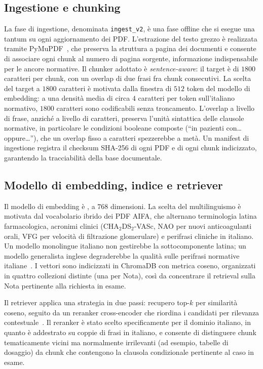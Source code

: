 \subsection{Ingestione e chunking}
\label{subsec:ingestione}

La fase di ingestione, denominata \texttt{ingest\_v2}, è una fase offline
che si esegue una tantum su ogni aggiornamento dei PDF.
L'estrazione del testo grezzo è realizzata tramite PyMuPDF~\cite{pymupdf},
che preserva la struttura a pagina dei documenti e consente di associare
ogni chunk al numero di pagina sorgente, informazione indispensabile per
le ancore normative.
Il chunker adottato è \emph{sentence-aware}: il target è di $1800$ caratteri
per chunk, con un overlap di due frasi fra chunk consecutivi.
La scelta del target a $1800$ caratteri è motivata dalla finestra di $512$
token del modello di embedding: a una densità media di circa $4$ caratteri
per token sull'italiano normativo, $1800$ caratteri sono codificabili senza
troncamento.
L'overlap a livello di frase, anziché a livello di caratteri, preserva
l'unità sintattica delle clausole normative, in particolare le condizioni
booleane composte (``in pazienti con\ldots oppure\ldots''), che un overlap
fisso a caratteri spezzerebbe a metà.
Un manifest di ingestione registra il checksum SHA-256 di ogni PDF e di
ogni chunk indicizzato, garantendo la tracciabilità della base documentale.

\subsection{Modello di embedding, indice e retriever}
\label{subsec:embedding-retriever}

Il modello di embedding è \embedmodel, a $768$ dimensioni.
La scelta del multilinguismo è motivata dal vocabolario ibrido dei PDF AIFA,
che alternano terminologia latina farmacologica, acronimi clinici
(CHA$_2$DS$_2$-VASc, NAO per nuovi anticoagulanti orali, VFG per velocità di filtrazione glomerulare) e perifrasi cliniche in italiano.
Un modello monolingue italiano non gestirebbe la sottocomponente latina;
un modello generalista inglese degraderebbe la qualità sulle perifrasi
normative italiane~\cite{reimers2019sbert}.
I vettori sono indicizzati in ChromaDB con metrica coseno, organizzati
in quattro collezioni distinte (una per Nota), così da concentrare il
retrieval sulla Nota pertinente alla richiesta in esame.

Il retriever applica una strategia in due passi: recupero top-$k$ per
similarità coseno, seguito da un reranker cross-encoder \reranker{}
che riordina i candidati per rilevanza contestuale~\cite{nogueira2019passage}.
Il reranker è stato scelto specificamente per il dominio italiano, in quanto
è addestrato su coppie di frasi in italiano, e consente di distinguere
chunk tematicamente vicini ma normalmente irrilevanti (ad esempio,
tabelle di dosaggio) da chunk che contengono la clausola condizionale
pertinente al caso in esame.

